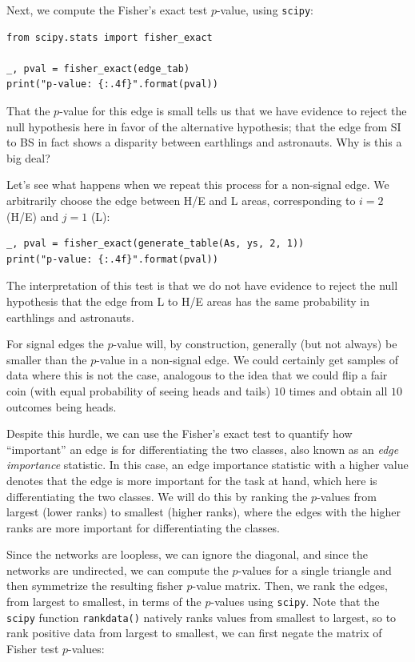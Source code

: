 Next, we compute the Fisher's exact test $p$-value, using \texttt{scipy}:

\begin{lstlisting}[style=python]
from scipy.stats import fisher_exact

_, pval = fisher_exact(edge_tab)
print("p-value: {:.4f}".format(pval))
\end{lstlisting}

That the $p$-value for this edge is small tells us that we have evidence to reject the null hypothesis here in favor of the alternative hypothesis; that the edge from SI to BS in fact shows a disparity between earthlings and astronauts. Why is this a big deal?

Let's see what happens when we repeat this process for a non-signal edge. We arbitrarily choose the edge between H/E and L areas, corresponding to $i=2$ (H/E) and $j=1$ (L):

\begin{lstlisting}[style=python]
_, pval = fisher_exact(generate_table(As, ys, 2, 1))
print("p-value: {:.4f}".format(pval))
\end{lstlisting}

The interpretation of this test is that we do not have evidence to reject the null hypothesis that the edge from L to H/E areas has the same probability in earthlings and astronauts. 

For signal edges the $p$-value will, by construction, generally (but not always) be smaller than the $p$-value in a non-signal edge. We could certainly get samples of data where this is not the case, analogous to the idea that we could flip a fair coin (with equal probability of seeing heads and tails) $10$ times and obtain all $10$ outcomes being heads. 

Despite this hurdle, we can use the Fisher's exact test to quantify how ``important'' an edge is for differentiating the two classes, also known as an \textit{edge importance} statistic. In this case, an edge importance statistic with a higher value denotes that the edge is more important for the task at hand, which here is differentiating the two classes. We will do this by ranking the $p$-values from largest (lower ranks) to smallest (higher ranks), where the edges with the higher ranks are more important for differentiating the classes.

Since the networks are loopless, we can ignore the diagonal, and since the networks are undirected, we can compute the $p$-values for a single triangle and then symmetrize the resulting fisher $p$-value matrix. Then, we rank the edges, from largest to smallest, in terms of the $p$-values using \texttt{scipy}. Note that the \texttt{scipy} function \texttt{rankdata()} natively ranks values from smallest to largest, so to rank positive data from largest to smallest, we can first negate the matrix of Fisher test $p$-values:

